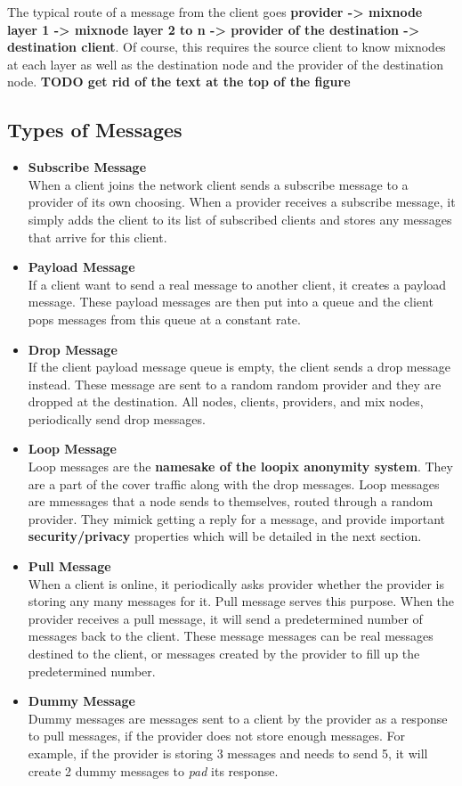 \documentclass[a4paper,11pt,oneside]{report}
\begin{document}
The typical route of a message from the client goes \textbf{provider -> mixnode layer 1 -> mixnode layer 2 to n -> provider of the destination -> destination client}. Of course, this requires the source client to know mixnodes at each layer as well as the destination node and the provider of the destination node.
\textbf{TODO get rid of the text at the top of the figure}

\subsection{Types of Messages}
\begin{itemize}
    \item \textbf{Subscribe Message} \\
    When a client joins the network client sends a subscribe message to a provider of its own choosing. When a provider receives a subscribe message, it simply adds the client to its list of subscribed clients and stores any messages that arrive for this client.
    \item \textbf{Payload Message} \\
    If a client want to send a real message to another client, it creates a payload message. These payload messages are then put into a queue and the client pops messages from this queue at a constant rate.
    \item \textbf{Drop Message} \\
    If the client payload message queue is empty, the client sends a drop message instead. These message are sent to a random random provider and they are dropped at the destination. All nodes, clients, providers, and mix nodes, periodically send drop messages.
    \item \textbf{Loop Message} \\
    Loop messages are the \textbf{namesake of the loopix anonymity system}. They are a part of the cover traffic along with the drop messages. Loop messages are mmessages that a node sends to themselves, routed through a random provider. They mimick getting a reply for a message, and provide important \textbf{security/privacy} properties which will be detailed in the next section.
    \item \textbf{Pull Message} \\
    When a client is online, it periodically asks provider whether the provider is storing any many messages for it. Pull message serves this purpose. When the provider receives a pull message, it will send a predetermined number of messages back to the client. These message messages can be real messages destined to the client, or messages created by the provider to fill up the predetermined number.
    \item \textbf{Dummy Message} \\
    Dummy messages are messages sent to a client by the provider as a response to pull messages, if the provider does not store enough messages. For example, if the provider is storing 3 messages and needs to send 5, it will create 2 dummy messages to \textit{pad} its response.
\end{itemize}
\end{document}
